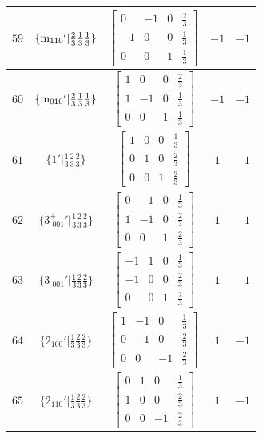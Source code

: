 \documentclass[fleqn,8pt]{jsarticle}
\begin{document}
\begin{longtable}{ccccc}
$ 59 $ & $ \{{\rm m}_{110}{}'|\frac{2}{3} \frac{1}{3} \frac{1}{3}\} $ & $ \begin{bmatrix} 0 & -1 & 0 & \frac{2}{3} \\ -1 & 0 & 0 & \frac{1}{3} \\ 0 & 0 & 1 & \frac{1}{3} \end{bmatrix} $ & $ -1 $ & $ -1 $ \\ \hline
$ 60 $ & $ \{{\rm m}_{010}{}'|\frac{2}{3} \frac{1}{3} \frac{1}{3}\} $ & $ \begin{bmatrix} 1 & 0 & 0 & \frac{2}{3} \\ 1 & -1 & 0 & \frac{1}{3} \\ 0 & 0 & 1 & \frac{1}{3} \end{bmatrix} $ & $ -1 $ & $ -1 $ \\ \hline
$ 61 $ & $ \{1{}'|\frac{1}{3} \frac{2}{3} \frac{2}{3}\} $ & $ \begin{bmatrix} 1 & 0 & 0 & \frac{1}{3} \\ 0 & 1 & 0 & \frac{2}{3} \\ 0 & 0 & 1 & \frac{2}{3} \end{bmatrix} $ & $ 1 $ & $ -1 $ \\ \hline
$ 62 $ & $ \{3^{+}_{\,\,001}{}'|\frac{1}{3} \frac{2}{3} \frac{2}{3}\} $ & $ \begin{bmatrix} 0 & -1 & 0 & \frac{1}{3} \\ 1 & -1 & 0 & \frac{2}{3} \\ 0 & 0 & 1 & \frac{2}{3} \end{bmatrix} $ & $ 1 $ & $ -1 $ \\ \hline
$ 63 $ & $ \{3^{-}_{\,\,001}{}'|\frac{1}{3} \frac{2}{3} \frac{2}{3}\} $ & $ \begin{bmatrix} -1 & 1 & 0 & \frac{1}{3} \\ -1 & 0 & 0 & \frac{2}{3} \\ 0 & 0 & 1 & \frac{2}{3} \end{bmatrix} $ & $ 1 $ & $ -1 $ \\ \hline
$ 64 $ & $ \{2{}_{100}{}'|\frac{1}{3} \frac{2}{3} \frac{2}{3}\} $ & $ \begin{bmatrix} 1 & -1 & 0 & \frac{1}{3} \\ 0 & -1 & 0 & \frac{2}{3} \\ 0 & 0 & -1 & \frac{2}{3} \end{bmatrix} $ & $ 1 $ & $ -1 $ \\ \hline
$ 65 $ & $ \{2{}_{110}{}'|\frac{1}{3} \frac{2}{3} \frac{2}{3}\} $ & $ \begin{bmatrix} 0 & 1 & 0 & \frac{1}{3} \\ 1 & 0 & 0 & \frac{2}{3} \\ 0 & 0 & -1 & \frac{2}{3} \end{bmatrix} $ & $ 1 $ & $ -1 $ \\ \hline

\end{longtable}
\end{document}
